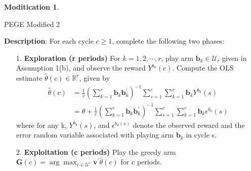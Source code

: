 \documentclass{article}
\theoremstyle{plain}
\theoremstyle{definition}
\newtheorem{modification}{Moditication}
\begin{document}
\begin{modification}
\begin{algorithm}\label{alg:PEGE2}
\caption{PEGE Modified 2}
\textbf{Description}: For each cycle $c\geq 1$, complete the following two phases:
\begin{itemize}
\item [1. ] \textbf{Exploration (r periods)} For $k=1,2,\cdots,r$, play arm $\textbf{b}_{k}\in \mathcal{U}_{r}$ given in Assumption 1(b), and observe the reward $Y^{b_{k}}(c)$. Compute the OLS estimate $\hat{\theta}(c)\in \mathbb{R}^{r}$, given by
\begin{align}
\hat{\theta}(c)&=\frac{1}{c}(\sum_{k=1}^{r}\textbf{b}_{k}\textbf{b}_{k}^{'})^{-1}\sum_{s=1}^{c}\sum_{k=1}^{r}\textbf{b}_{k}Y^{b_{k}}(s) \nonumber \\
&=\theta+\frac{1}{c}(\sum_{k=1}^{r}\textbf{b}_{k}\textbf{b}_{k}^{'})^{-1}\sum_{s=1}^{c}\sum_{k=1}^{r}\textbf{b}_{k}\epsilon^{b_{k}}(s) \nonumber 
\end{align}
where for any k, $Y^{b_{k}}(s)$, and $\epsilon^{b_{k}(s)}$ denote the observed reward and the error random variable associated with playing arm $\textbf{b}_{k}$ in cycle s.
\item [2. ] \textbf{Exploitation (c periods)} Play the greedy arm $\textbf{G}(c)=\arg \max_{v\in \mathcal{U}^{r}}\textbf{v}^{'}\hat{\theta}(c)$ for c periods.
\end{itemize}

\end{algorithm}

\end{modification}
\end{document}
